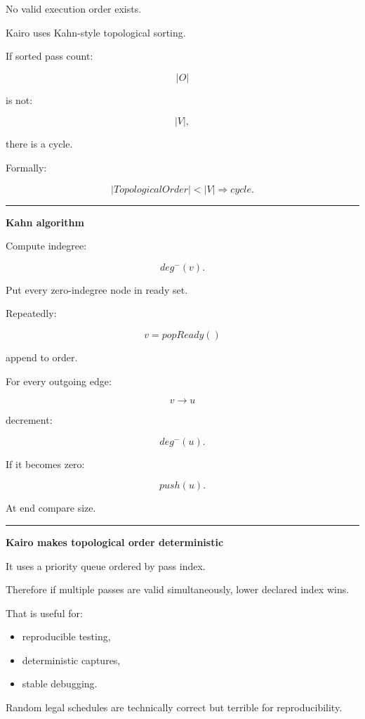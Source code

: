 No valid execution order exists.

Kairo uses Kahn-style topological sorting.

If sorted pass count:

\[
|O|
\]

is not:

\[
|V|,
\]

there is a cycle.

Formally:

\[
\boxed{
|TopologicalOrder|<|V|
\Rightarrow
cycle.
}
\]

\begin{center}\rule{0.5\linewidth}{0.5pt}\end{center}

\textbf{Kahn algorithm}

Compute indegree:

\[
deg^{-}(v).
\]

Put every zero-indegree node in ready set.

Repeatedly:

\[
v=popReady()
\]

append to order.

For every outgoing edge:

\[
v\rightarrow u
\]

decrement:

\[
deg^{-}(u).
\]

If it becomes zero:

\[
push(u).
\]

At end compare size.

\begin{center}\rule{0.5\linewidth}{0.5pt}\end{center}

\textbf{Kairo makes topological order deterministic}

It uses a priority queue ordered by pass index.

Therefore if multiple passes are valid simultaneously, lower declared index wins.

That is useful for:

\begin{itemize}
\tightlist
\item
  reproducible testing,
\item
  deterministic captures,
\item
  stable debugging.
\end{itemize}

Random legal schedules are technically correct but terrible for reproducibility.


